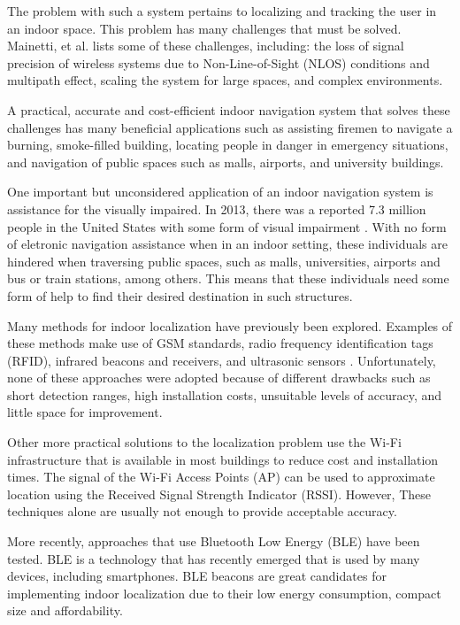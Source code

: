 \documentclass[conference]{IEEEtran}
\begin{document}
The problem with such a system pertains to localizing and tracking the user in an indoor space. This problem has many challenges that must be solved. Mainetti, et al. \cite{mainetti2014survey} lists some of these challenges, including: the loss of signal precision of wireless systems due to Non-Line-of-Sight (NLOS) conditions and multipath effect, scaling the system for large spaces, and complex environments.

A practical, accurate and cost-efficient indoor navigation system that solves these challenges has many beneficial applications such as assisting firemen to navigate a burning, smoke-filled building, locating people in danger in emergency situations, and navigation of public spaces such as malls, airports, and university buildings.

One important but unconsidered application of an indoor navigation system is assistance for the visually impaired. In 2013, there was a reported 7.3 million people in the United States with some form of visual impairment \cite{NFB}. With no form of eletronic navigation assistance when in an indoor setting, these individuals are hindered when traversing public spaces, such as malls, universities, airports and bus or train stations, among others. This means that these individuals need some form of help to find their desired destination in such structures.

Many methods for indoor localization have previously been explored. Examples of these methods make use of GSM standards, radio frequency identification tags (RFID), infrared beacons and receivers, and ultrasonic sensors \cite{otsason2005accurate,li2011performance,liu2014survey,ward1997new,medina2013ultrasound}. Unfortunately, none of these approaches were adopted because of different drawbacks such as short detection ranges, high installation costs, unsuitable levels of accuracy, and little space for improvement.

Other more practical solutions to the localization problem use the Wi-Fi infrastructure that is available in most buildings to reduce cost and installation times. The signal of the Wi-Fi Access Points (AP) can be used to approximate location using the Received Signal Strength Indicator (RSSI). However, These techniques alone are usually not enough to provide acceptable accuracy.

More recently, approaches that use Bluetooth Low Energy (BLE) have been tested. BLE is a technology that has recently emerged that is used by many devices, including smartphones. BLE beacons are great candidates for implementing indoor localization due to their low energy consumption, compact size and affordability.
\end{document}
